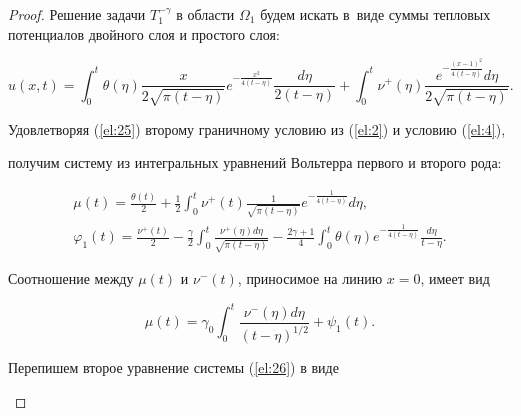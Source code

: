 \begin{proof}

Решение задачи $T_1^{-\gamma}$ в области $\Omega_1$ будем искать в~виде суммы тепловых потенциалов двойного слоя и простого слоя:

\begin{equation} \label{el:25}

u(x,t)=\int_0^t\theta(\eta)\frac{x}{2\sqrt{\pi(t-\eta)}}e^{-\frac{x^2}{4(t-\eta)}}\frac{d\eta}{2(t-\eta)}+\int_0^t\nu^+(\eta)\frac{e^{-\frac{(x-1)^2}{4(t-\eta)}}d\eta}{2\sqrt{\pi(t-\eta)}}.

\end{equation}

Удовлетворяя (\ref{el:25}) второму граничному условию из (\ref{el:2}) и  условию (\ref{el:4}),

получим систему из интегральных уравнений Вольтерра первого и второго рода:

\begin{equation} \label{el:26}

\begin{array}{l}

\displaystyle

\mu(t)=\frac{\theta(t)}{2}+\frac{1}{2}\int_0^t\nu^+(t)\frac{1}{\sqrt{\pi(t-\eta)}}e^{-\frac{1}{4(t-\eta)}}d\eta,

\\[2mm] 

\displaystyle

\varphi_1(t)=\frac{\nu^+(t)}{2}-\frac{\gamma}{2}\int_0^t\frac{\nu^+(\eta)d\eta}{\sqrt{\pi(t-\eta)}}-\frac{2\gamma+1}{4}\int_0^t\theta(\eta)e^{-\frac{1}{4(t-\eta)}}\frac{d\eta}{t-\eta}.

\end{array}

\end{equation}

Соотношение между $\mu(t)$ и $\nu^-(t)$, приносимое на линию $x=0$, имеет вид

\begin{equation} \label{el:27}

\mu(t)=\gamma_0\int_0^t\frac{\nu^-(\eta)d\eta}{(t-\eta)^{1/2}}+\psi_1(t).

\end{equation}



Перепишем второе уравнение системы (\ref{el:26}) в виде

\begin{equation} \label{el:28}


\end{equation}
\end{proof}
